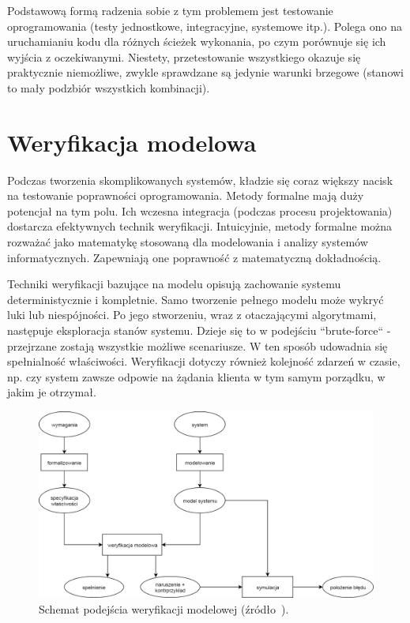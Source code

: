 Podstawową formą radzenia sobie z tym problemem jest testowanie oprogramowania (testy jednostkowe, integracyjne, systemowe itp.). Polega ono na uruchamianiu kodu dla różnych ścieżek wykonania, po czym porównuje się ich wyjścia z oczekiwanymi. Niestety, przetestowanie wszystkiego okazuje się praktycznie niemożliwe, zwykle sprawdzane są jedynie warunki brzegowe (stanowi to mały podzbiór wszystkich kombinacji). 


\section{Weryfikacja modelowa}

Podczas tworzenia skomplikowanych systemów, kładzie się coraz większy nacisk na testowanie poprawności oprogramowania. Metody formalne mają duży potencjał na tym polu. Ich wczesna integracja (podczas procesu projektowania) dostarcza efektywnych technik weryfikacji.
Intuicyjnie, metody formalne można rozważać jako matematykę stosowaną dla modelowania i analizy systemów informatycznych. Zapewniają one poprawność z matematyczną dokładnością.

Techniki weryfikacji bazujące na modelu opisują zachowanie systemu deterministycznie i kompletnie. Samo tworzenie pełnego modelu może wykryć luki lub niespójności.
Po jego stworzeniu, wraz z otaczającymi algorytmami, następuje eksploracja stanów systemu.
Dzieje się to w podejściu ``brute-force`` - przejrzane zostają wszystkie możliwe scenariusze.
W ten sposób udowadnia się spełnialność właściwości. Weryfikacji dotyczy również kolejność zdarzeń w czasie, np. czy system zawsze odpowie na żądania klienta w tym samym porządku, w jakim je otrzymał.

\vspace{0.5cm}
\begin{figure}[h]
    \centering
    \includegraphics[width=\textwidth,keepaspectratio]{img/model_checking_approach_schematic_view.png}
    \caption{Schemat podejścia weryfikacji modelowej (źródło~\cite{Bai08}).}
    \label{fig:model_checking_scheme}
\end{figure}

